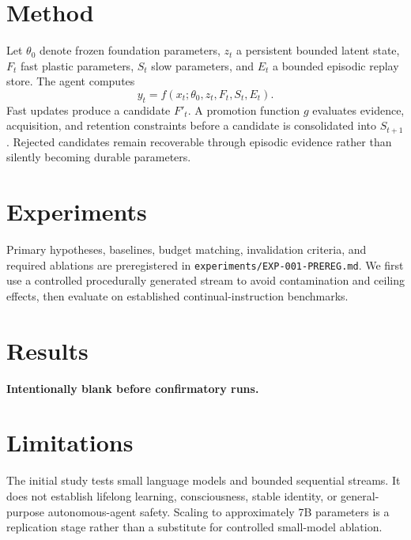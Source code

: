 \documentclass[11pt]{article}
\begin{document}
\section{Method}
Let $\theta_0$ denote frozen foundation parameters, $z_t$ a persistent bounded latent state, $F_t$ fast plastic parameters, $S_t$ slow parameters, and $E_t$ a bounded episodic replay store. The agent computes
\[
y_t = f(x_t; \theta_0, z_t, F_t, S_t, E_t).
\]
Fast updates produce a candidate $F'_t$. A promotion function $g$ evaluates evidence, acquisition, and retention constraints before a candidate is consolidated into $S_{t+1}$. Rejected candidates remain recoverable through episodic evidence rather than silently becoming durable parameters.

\section{Experiments}
Primary hypotheses, baselines, budget matching, invalidation criteria, and required ablations are preregistered in \texttt{experiments/EXP-001-PREREG.md}. We first use a controlled procedurally generated stream to avoid contamination and ceiling effects, then evaluate on established continual-instruction benchmarks.

\section{Results}
\textbf{Intentionally blank before confirmatory runs.}

\section{Limitations}
The initial study tests small language models and bounded sequential streams. It does not establish lifelong learning, consciousness, stable identity, or general-purpose autonomous-agent safety. Scaling to approximately 7B parameters is a replication stage rather than a substitute for controlled small-model ablation.



\end{document}
